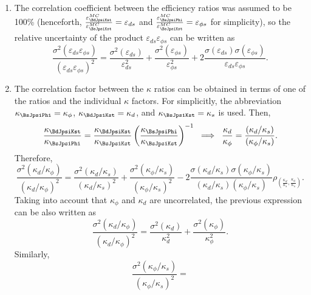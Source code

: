 %
\begin{enumerate}
\item{} The correlation coefficient between the efficiency ratios was assumed to be 100\%
(henceforth, $\frac{\varepsilon_{\BdJpsiKst}^{MC}}{\varepsilon_{\BsJpsiKst}^{MC}} =
\varepsilon_{ds}$ and $\frac{\varepsilon_{\BsJpsiPhi}^{MC}}{\varepsilon_{\BsJpsiKst}^{MC}} =
\varepsilon_{{\phi}s}$ for simplicity), so the relative uncertainty of the product
$\varepsilon_{ds}\varepsilon_{\phi s}$ can be written as
\begin{equation}
\label{eq:theCorrEffs}
\frac{\sigma^2(\varepsilon_{ds}\varepsilon_{\phi s})}{(\varepsilon_{ds}\varepsilon_{\phi s})^2} =
\frac{\sigma^2(\varepsilon_{ds})}{\varepsilon_{ds}^2} + 
\frac{\sigma^2(\varepsilon_{\phi s})}{\varepsilon_{\phi s}^2} + 
2\frac{\sigma(\varepsilon_{ds})\sigma(\varepsilon_{{\phi}s})}{\varepsilon_{ds}\varepsilon_{{\phi}s}}.
\end{equation}
%
\item{} The correlation factor between the $\kappa$ ratios can be obtained in terms of one of the
ratios and the individual $\kappa$ factors.  For simplicitly, the abbreviation $\kappa_{\BsJpsiPhi} =
\kappa_\phi$, $\kappa_{\BdJpsiKst} = \kappa_d$, and $\kappa_{\BsJpsiKst} = \kappa_s$ is used. Then,
%
\[
\frac{\kappa_{\BdJpsiKst}}{\kappa_{\BsJpsiPhi}} =
\frac{\kappa_{\BdJpsiKst}}{\kappa_{\BsJpsiKst}}
\left(\frac{\kappa_{\BsJpsiPhi}}{\kappa_{\BsJpsiKst}}\right)^{-1}\;\; \Longrightarrow\;\;
\frac{\kappa_d}{\kappa_\phi} = \frac{(\kappa_d/\kappa_s)}{(\kappa_\phi/\kappa_s)}.
\]
%
Therefore,
%
\begin{equation}
\frac{\sigma^2(\kappa_d/\kappa_\phi)}{(\kappa_d/\kappa_\phi)^2} =
\frac{\sigma^2(\kappa_d/\kappa_s)}{(\kappa_d/\kappa_s)^2} +
\frac{\sigma^2(\kappa_\phi/\kappa_s)}{(\kappa_\phi/\kappa_s)^2} -
2\frac{\sigma(\kappa_d/\kappa_s)\sigma(\kappa_\phi/\kappa_s)}
{(\kappa_d/\kappa_s)(\kappa_\phi/\kappa_s)}
\rho_{\left(\frac{\kappa_d}{\kappa_s},\frac{\kappa_\phi}{\kappa_s}\right)}.
\end{equation}
%
Taking into account that $\kappa_{\phi}$ and $\kappa_{d}$ are uncorrelated, the previous expression can be also written as
\begin{equation}
\frac{\sigma^2(\kappa_d/\kappa_\phi)}{(\kappa_d/\kappa_\phi)^2} =
\frac{\sigma^2(\kappa_d)}{\kappa_d^2} + \frac{\sigma^2(\kappa_\phi)}{\kappa_\phi^2}.
\end{equation}
%
Similarly,
%
\begin{equation}
\frac{\sigma^2(\kappa_\phi/\kappa_s)}{(\kappa_\phi/\kappa_s)^2} =

\end{equation}
\end{enumerate}
